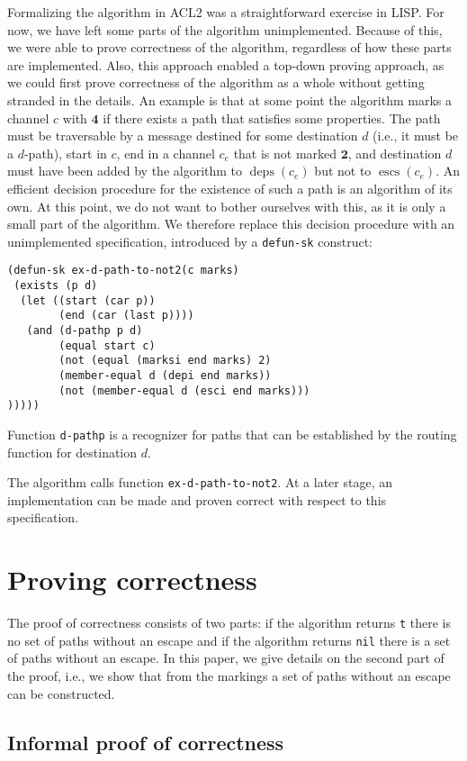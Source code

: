 \documentclass[submission,copyright]{eptcs}
\DeclareMathOperator{\escs}{escs}
\DeclareMathOperator{\deps}{deps}
\begin{document}
Formalizing the algorithm in ACL2 was a straightforward exercise in LISP. For now, we have left some parts of the algorithm unimplemented. Because of this, we were able to prove correctness of the algorithm, regardless of how these parts are implemented. Also, this approach enabled a top-down proving approach, as we could first prove correctness of the algorithm as a whole without getting stranded in the details. An example is that at some point the algorithm marks a channel $c$ with $\mathbf{4}$ if there exists a path that satisfies some properties. The path must be traversable by a message destined for some destination $d$ (i.e., it must be a $d$-path), start in $c$, end in a channel $c_e$ that is not marked $\mathbf{2}$, and destination $d$ must have been added by the algorithm to $\deps(c_e)$ but not to $\escs(c_e)$. An efficient decision procedure for the existence of such a path is an algorithm of its own. At this point, we do not want to bother ourselves with this, as it is only a small part of the algorithm. We therefore replace this decision procedure with an unimplemented specification, introduced by a {\tt defun-sk} construct:
\begin{verbatim}
(defun-sk ex-d-path-to-not2(c marks)
 (exists (p d)
  (let ((start (car p))
        (end (car (last p))))
   (and (d-pathp p d)
        (equal start c)
        (not (equal (marksi end marks) 2)
        (member-equal d (depi end marks))
        (not (member-equal d (esci end marks)))
)))))
\end{verbatim}
Function {\tt d-pathp} is a recognizer for paths that can be established by the routing function for destination $d$.

The algorithm calls function {\tt ex-d-path-to-not2}. At a later stage, an implementation can be made and proven correct with respect to this specification.

\section{Proving correctness}\label{sec:proof}

The proof of correctness consists of two parts: if the algorithm returns {\tt t} there is no set of paths without an escape and if the algorithm returns {\tt nil} there is a set of paths without an escape. In this paper, we give details on the second part of the proof, i.e., we show that from the markings a set of paths without an escape can be constructed.

\subsection{Informal proof of correctness}
\end{document}
